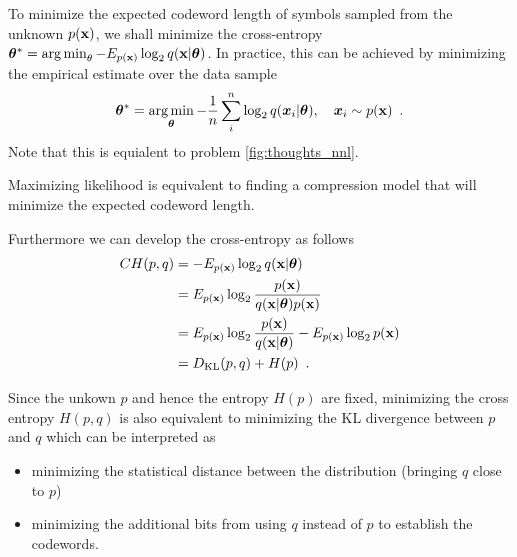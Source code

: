 To minimize the expected codeword length of symbols sampled from the unknown $p({\mathbf{x}})$, we shall minimize the cross-entropy ${\bm{\theta}}^* = \operatorname*{arg\,min}_\theta - E_{p({\mathbf{x}})} \log_2 q({\mathbf{x}} | {\bm{\theta}})$. 
In practice, this can be achieved by minimizing the empirical estimate over the data sample
\begin{align}\label{fig:thoughts_ce}
{\bm{\theta}}^* = \operatorname*{arg\,min}_{\bm{\theta}} - \frac{1}{n} \sum_i^n \log_2 q({\bm{x}}_i | {\bm{\theta}}), \quad {\bm{x}}_i \sim p({\mathbf{x}}) \enspace .
\end{align}
Note that this is equialent to problem \eqref{fig:thoughts_nnl}.
\begin{notebox}
Maximizing likelihood is equivalent to finding a compression model that will minimize the expected codeword length.
\end{notebox}

Furthermore we can develop the cross-entropy as follows
\begin{align}\label{fig:thoughts_kl}
CH(p, q) & = - E_{p({\mathbf{x}})} \log_2 q({\mathbf{x}} | {\bm{\theta}}) \nonumber \\
& = E_{p({\mathbf{x}})} \log_2 \frac{p({\mathbf{x}})}{q({\mathbf{x}} | {\bm{\theta}})p({\mathbf{x}})} \nonumber \\
& = E_{p({\mathbf{x}})} \log_2 \frac{p({\mathbf{x}})}{q({\mathbf{x}} | {\bm{\theta}})} - E_{p({\mathbf{x}})} \log_2 p({\mathbf{x}}) \nonumber \\
& = D_{\mathrm{KL}}(p, q) + H(p) \enspace .
\end{align}

Since the unkown $p$ and hence the entropy $H(p)$ are fixed, minimizing the cross entropy $H(p, q)$ is also equivalent to minimizing the KL divergence between $p$ and $q$ which can be interpreted as
\begin{itemize}[noitemsep, topsep=0pt]
\item minimizing the statistical distance between the distribution (bringing $q$ close to $p$)
\item minimizing the additional bits from using $q$ instead of $p$ to establish the codewords.
\end{itemize}

